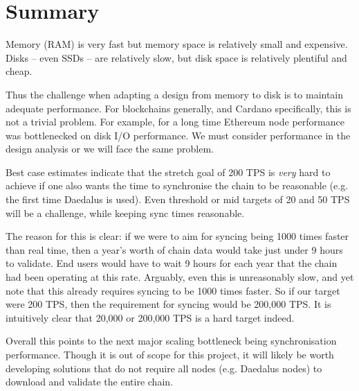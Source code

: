 \documentclass[11pt,a4paper]{article}
\begin{document}
\section{Summary}
\label{summary}

Memory (RAM) is very fast but memory space is relatively small and expensive.
Disks -- even SSDs -- are relatively slow, but disk space is relatively
plentiful and cheap.

Thus the challenge when adapting a design from memory to disk is to maintain
adequate performance. For blockchains generally, and Cardano specifically, this
is not a trivial problem. For example, for a long time Ethereum node performance
was bottlenecked on disk I/O performance. We must consider performance in the
design analysis or we will face the same problem.

Best case estimates indicate that the stretch goal of 200 TPS is \emph{very}
hard to achieve if one also wants the time to synchronise the chain to be
reasonable (e.g. the first time Daedalus is used). Even threshold or mid
targets of 20 and 50 TPS will be a challenge, while keeping sync times
reasonable.

The reason for this is clear: if we were to aim for syncing being 1000 times
faster than real time, then a year's worth of chain data would take just under
9 hours to validate. End users would have to wait 9 hours for each year that
the chain had been operating at this rate. Arguably, even this is unreasonably
slow, and yet note that this already requires syncing to be 1000 times faster.
So if our target were 200 TPS, then the requirement for syncing would be
200,000 TPS. It is intuitively clear that 20,000 or 200,000 TPS is a hard
target indeed.

Overall this points to the next major scaling bottleneck being synchronisation
performance. Though it is out of scope for this project, it will likely be
worth developing solutions that do not require all nodes (e.g. Daedalus nodes)
to download and validate the entire chain.
\end{document}
